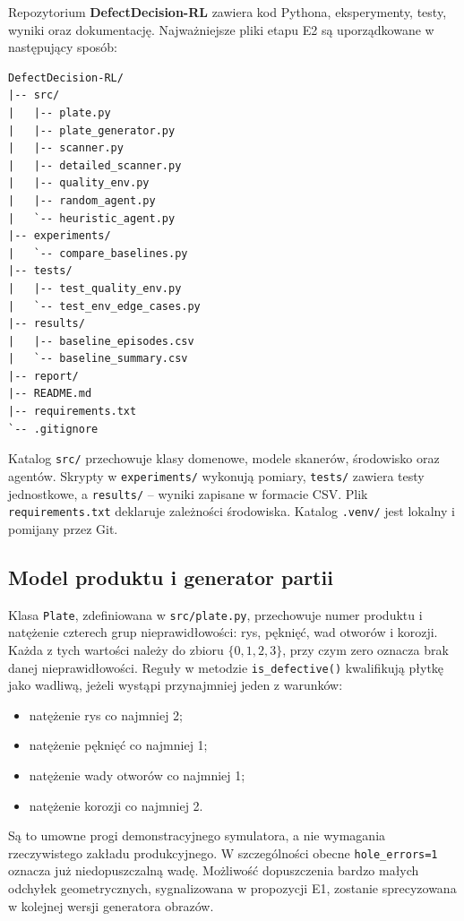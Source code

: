 \documentclass[12pt]{article}
\begin{document}
Repozytorium \textbf{DefectDecision-RL} zawiera kod Pythona, eksperymenty, testy, wyniki oraz dokumentację. Najważniejsze pliki etapu E2 są uporządkowane w następujący sposób:

\begin{verbatim}
DefectDecision-RL/
|-- src/
|   |-- plate.py
|   |-- plate_generator.py
|   |-- scanner.py
|   |-- detailed_scanner.py
|   |-- quality_env.py
|   |-- random_agent.py
|   `-- heuristic_agent.py
|-- experiments/
|   `-- compare_baselines.py
|-- tests/
|   |-- test_quality_env.py
|   `-- test_env_edge_cases.py
|-- results/
|   |-- baseline_episodes.csv
|   `-- baseline_summary.csv
|-- report/
|-- README.md
|-- requirements.txt
`-- .gitignore
\end{verbatim}

Katalog \texttt{src/} przechowuje klasy domenowe, modele skanerów, środowisko oraz agentów. Skrypty w \texttt{experiments/} wykonują pomiary, \texttt{tests/} zawiera testy jednostkowe, a \texttt{results/} -- wyniki zapisane w formacie CSV. Plik \texttt{requirements.txt} deklaruje zależności środowiska. Katalog \texttt{.venv/} jest lokalny i pomijany przez Git.

\subsection{Model produktu i generator partii}

Klasa \texttt{Plate}, zdefiniowana w \texttt{src/plate.py}, przechowuje numer produktu i natężenie czterech grup nieprawidłowości: rys, pęknięć, wad otworów i korozji. Każda z tych wartości należy do zbioru \(\{0,1,2,3\}\), przy czym zero oznacza brak danej nieprawidłowości. Reguły w metodzie \texttt{is\_defective()} kwalifikują płytkę jako wadliwą, jeżeli wystąpi przynajmniej jeden z warunków:
\begin{itemize}[nosep]
    \item natężenie rys co najmniej 2;
    \item natężenie pęknięć co najmniej 1;
    \item natężenie wady otworów co najmniej 1;
    \item natężenie korozji co najmniej 2.
\end{itemize}

Są to umowne progi demonstracyjnego symulatora, a nie wymagania rzeczywistego zakładu produkcyjnego. W szczególności obecne \texttt{hole\_errors=1} oznacza już niedopuszczalną wadę. Możliwość dopuszczenia bardzo małych odchyłek geometrycznych, sygnalizowana w propozycji E1, zostanie sprecyzowana w kolejnej wersji generatora obrazów.
\end{document}
